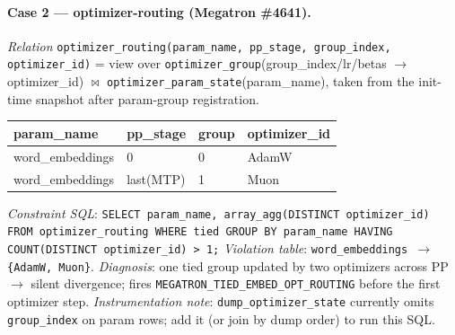 
\paragraph{Case 2 — optimizer-routing (Megatron \#4641).}
\emph{Relation} \texttt{optimizer\_routing(param\_name, pp\_stage, group\_index, optimizer\_id)} = view over
\texttt{optimizer\_group}(group\_index/lr/betas $\to$ optimizer\_id) $\bowtie$ \texttt{optimizer\_param\_state}(param\_name),
taken from the init-time snapshot after param-group registration.
\begin{center}\small
\begin{tabular}{@{}llll@{}}
\toprule
param\_name & pp\_stage & group & optimizer\_id \\\midrule
word\_embeddings & 0        & 0 & AdamW \\
word\_embeddings & last(MTP) & 1 & Muon  \\\bottomrule
\end{tabular}
\end{center}
\emph{Constraint SQL}: \texttt{SELECT param\_name, array\_agg(DISTINCT optimizer\_id) FROM optimizer\_routing WHERE tied GROUP BY param\_name HAVING COUNT(DISTINCT optimizer\_id) > 1;}
\quad\emph{Violation table}: \texttt{word\_embeddings $\to$ \{AdamW, Muon\}}.
\quad\emph{Diagnosis}: one tied group updated by two optimizers across PP $\to$ silent divergence; fires \texttt{MEGATRON\_TIED\_EMBED\_OPT\_ROUTING} before the first optimizer step.
\emph{Instrumentation note}: \texttt{dump\_optimizer\_state} currently omits \texttt{group\_index} on param rows; add it (or join by dump order) to run this SQL.

